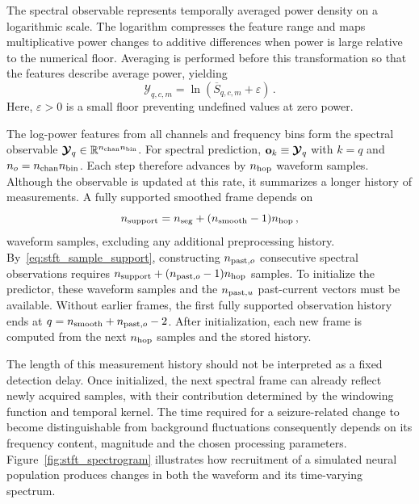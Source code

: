 The spectral observable represents temporally averaged power density on a logarithmic scale.
The logarithm compresses the feature range and maps multiplicative power changes to additive differences when power is large relative to the numerical floor.
Averaging is performed before this transformation so that the features describe average power, yielding
\begin{equation*}
    \mathcal{Y}_{q,c,m}
    =
    \ln\left(
        \overline{S}_{q,c,m}+\varepsilon
    \right)\,. %
\end{equation*}
Here, $\varepsilon>0$ is a small floor preventing undefined values at zero power.

The log-power features from all channels and frequency bins form the spectral observable $\boldsymbol{\mathcal{Y}}{}_q\in\mathbb R^{n_{\mathrm{chan}}{}n_{\mathrm{bin}}{}}$.
For spectral prediction, $\mathbf{o}_k\equiv\boldsymbol{\mathcal{Y}}{}_q$ with $k=q$ and $n_{o}=n_{\mathrm{chan}}{}n_{\mathrm{bin}}{}$.
Each step therefore advances by $n_{\mathrm{hop}}{}$ waveform samples.
Although the observable is updated at this rate, it summarizes a longer history of measurements.
A fully supported smoothed frame depends on
\begin{equation}
    n_{\mathrm{support}}
    =
    n_{\mathrm{seg}}{}+(n_{\mathrm{smooth}}{}-1)n_{\mathrm{hop}}{}\,,
    \label{eq:stft_sample_support}
\end{equation}
waveform samples, excluding any additional preprocessing history.
By~\eqref{eq:stft_sample_support}, constructing $n_{\mathrm{past},o}$ consecutive spectral observations requires $n_{\mathrm{support}}+(n_{\mathrm{past},o}-1)n_{\mathrm{hop}}{}$ samples.
To initialize the predictor, these waveform samples and the $n_{\mathrm{past},u}$ past-current vectors must be available.
Without earlier frames, the first fully supported observation history ends at $q=n_{\mathrm{smooth}}{}+n_{\mathrm{past},o}-2$.
After initialization, each new frame is computed from the next $n_{\mathrm{hop}}{}$ samples and the stored history.

The length of this measurement history should not be interpreted as a fixed detection delay.
Once initialized, the next spectral frame can already reflect newly acquired samples, with their contribution determined by the windowing function and temporal kernel.
The time required for a seizure-related change to become distinguishable from background fluctuations consequently depends on its frequency content, magnitude and the chosen processing parameters.
Figure~\ref{fig:stft_spectrogram} illustrates how recruitment of a simulated neural population produces changes in both the waveform and its time-varying spectrum.

